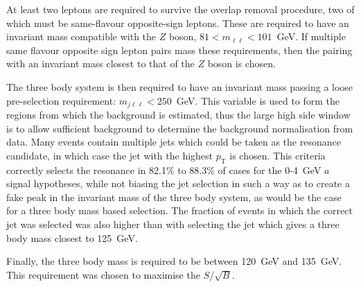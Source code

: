 \documentclass[NOTE, atlasdraft=true, texlive=2017, UKenglish]{\ATLASLATEXPATH atlasdoc}
\begin{document}
At least two leptons are required to survive the overlap removal procedure, two of which must be same-flavour opposite-sign leptons. These are required to have an invariant mass compatible with the $Z$ boson, $81<m_{\ell\ell}<101$~GeV. If multiple same flavour opposite sign lepton pairs mass these requirements, then the pairing with an invariant mass closest to that of the $Z$ boson is chosen.

The three body system is then required to have an invariant mass passing a loose pre-selection requirement: $m_{j\ell\ell}<250$~GeV. This variable is used to form the regions from which the background is estimated, thus the large high side window is to allow sufficient background to determine the background normalisation from data. Many events contain multiple jets which could be taken as the resonance candidate, in which case the jet with the highest $p_\text{T}$ is chosen. This criteria correctly selects the resonance in 82.1\% to 88.3\% of cases for the 0-4~GeV $a$ signal hypotheses, while not biasing the jet selection in such a way as to create a fake peak in the invariant mass of the three body system, as would be the case for a three body mass based selection. The fraction of events in which the correct jet was selected was also higher than with selecting the jet which gives a three body mass closest to 125~GeV.

Finally, the three body mass is required to be between 120~GeV and 135~GeV. This requirement was chosen to maximise the $S/\sqrt{B}$.

\end{document}

